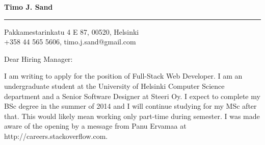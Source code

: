 \documentclass{letter} %
\begin{document}
\signature{Timo J. Sand}           %
\longindentation=0pt                       %
\let\raggedleft\raggedright                %


\begin{letter}{%
}


\begin{flushleft}
{\large\bf Timo J. Sand}
\end{flushleft}
\medskip\hrule height 1pt
\begin{flushright}
\hfill Pakkamestarinkatu 4 E 87, 00520, Helsinki \\
\hfill +358 44 565 5606, timo.j.sand@gmail.com
\end{flushright}
\vfill %


\opening{Dear Hiring Manager:}

\noindent
I am writing to apply for the position of Full-Stack Web Developer. I am an undergraduate student at the University of Helsinki Computer Science department and a Senior Software Designer at Steeri Oy. I expect to complete my BSc degree in the summer of 2014 and I will continue studying for my MSc after that. This would likely mean working only part-time during semester. I was made aware of the opening by a message from Panu Ervamaa at http://careers.stackoverflow.com.

\noindent


\end{letter}
\end{document}
